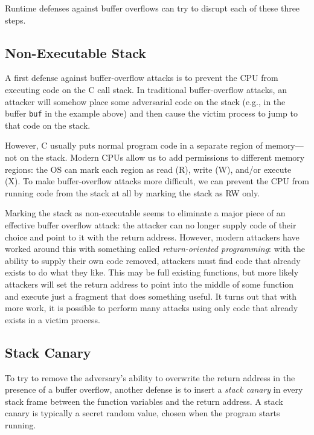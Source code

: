 \documentclass[
  letterpaper,
]{scrbook}
\theoremstyle{definition}
\theoremstyle{plain}
\theoremstyle{plain}
\theoremstyle{remark}
\begin{document}
Runtime defenses against buffer overflows can try to disrupt each of
these three steps.

\subsection{Non-Executable Stack}\label{sec-overflow-nx}

A first defense against buffer-overflow attacks is to prevent the CPU
from executing code on the C call stack. In traditional buffer-overflow
attacks, an attacker will somehow place some adversarial code on the
stack (e.g., in the buffer \texttt{buf} in the example above) and then
cause the victim process to jump to that code on the stack.

However, C usually puts normal program code in a separate region of
memory---not on the stack. Modern CPUs allow us to add permissions to
different memory regions: the OS can mark each region as read (R), write
(W), and/or execute (X). To make buffer-overflow attacks more difficult,
we can prevent the CPU from running code from the stack at all by
marking the stack as RW only.


Marking the stack as non-executable seems to eliminate a major piece of
an effective buffer overflow attack: the attacker can no longer supply
code of their choice and point to it with the return address. However,
modern attackers have worked around this with something called
\emph{return-oriented programming}: with the ability to supply their own
code removed, attackers must find code that already exists to do what
they like. This may be full existing functions, but more likely
attackers will set the return address to point into the middle of some
function and execute just a fragment that does something useful. It
turns out that with more work, it is possible to perform many attacks
using only code that already exists in a victim process.

\subsection{Stack Canary}\label{stack-canary}

To try to remove the adversary's ability to overwrite the return address
in the presence of a buffer overflow, another defense is to insert a
\emph{stack canary} in every stack frame between the function variables
and the return address. A stack canary is typically a secret random
value, chosen when the program starts running.
\end{document}
